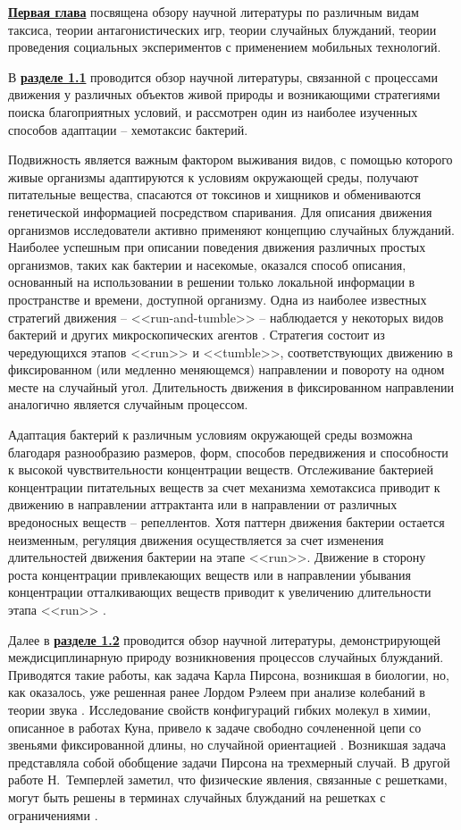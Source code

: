 \underline{\textbf{Первая глава}} посвящена обзору научной литературы по различным видам таксиса, теории антагонистических игр, теории случайных блужданий, теории проведения социальных экспериментов с применением мобильных технологий.

В \underline{\textbf{разделе 1.1}} проводится обзор научной литературы, связанной с процессами движения у различных объектов живой природы и возникающими стратегиями поиска благоприятных условий, и рассмотрен один из наиболее изученных способов адаптации -- хемотаксис бактерий. 

Подвижность является важным фактором выживания видов, с помощью которого живые организмы адаптируются к условиям окружающей среды, получают питательные вещества, спасаются от токсинов и хищников и обмениваются генетической информацией посредством спаривания. Для описания движения организмов исследователи активно применяют концепцию случайных блужданий. Наиболее успешным при описании поведения движения различных простых организмов, таких как бактерии и насекомые, оказался способ описания, основанный на использовании в решении только локальной информации в пространстве и времени, доступной организму. Одна из наиболее известных стратегий движения -- <<run-and-tumble>> -- наблюдается у некоторых видов бактерий и других микроскопических агентов \cite{berg_coli_2004}. Стратегия состоит из чередующихся этапов <<run>> и <<tumble>>, соответствующих движению в фиксированном (или медленно меняющемся) направлении и повороту на одном месте на случайный угол. Длительность движения в фиксированном направлении аналогично является случайным процессом.

Адаптация бактерий к различным условиям окружающей среды возможна благодаря разнообразию размеров, форм, способов передвижения и способности к высокой чувствительности концентрации веществ. Отслеживание бактерией концентрации питательных веществ за счет механизма хемотаксиса приводит к движению в направлении аттрактанта или в направлении от различных вредоносных веществ -- репеллентов. Хотя паттерн движения бактерии остается неизменным, регуляция движения осуществляется за счет изменения длительностей движения бактерии на этапе <<run>>. Движение в сторону роста концентрации привлекающих веществ или в направлении убывания концентрации отталкивающих веществ приводит к увеличению длительности этапа <<run>> \cite{berg_chemotaxis_1972}.

Далее в \underline{\textbf{разделе 1.2}} проводится обзор научной литературы, демонстрирующей междисциплинарную природу возникновения процессов случайных блужданий. Приводятся такие работы, как задача Карла Пирсона, возникшая в биологии, но, как оказалось, уже решенная ранее Лордом Рэлеем при анализе колебаний в теории звука \cite{pearson_problem_1905,rayleigh_problem_1905}. Исследование свойств конфигураций гибких молекул в химии, описанное в работах Куна, привело к задаче свободно сочлененной цепи со звеньями фиксированной длины, но случайной ориентацией \cite{kuhn_uber_1930}. Возникшая задача представляла собой обобщение задачи Пирсона на трехмерный случай. В другой работе Н.~Темперлей заметил, что физические явления, связанные с решетками, могут быть решены в терминах случайных блужданий на решетках с ограничениями \cite{temperley_combinatorial_1956}.

